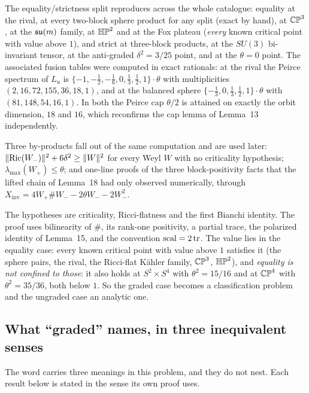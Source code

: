 \begin{certificate}
The equality/strictness split reproduces across the whole catalogue: equality at the rival, at every two-block sphere product for any split (exact by hand), at $\mathbb{CP}^3$, at the $\mathfrak{su}(m)$ family, at $\mathbb{HP}^2$ and at the Fox plateau (\emph{every} known critical point with value above $1$), and strict at three-block products, at the $SU(3)$ bi-invariant tensor, at the anti-graded $\delta^2=3/25$ point, and at the $\theta=0$ point. The associated fusion tables were computed in exact rationals: at the rival the Peirce spectrum of $L_u$ is $\{-1,-\tfrac12,-\tfrac16,0,\tfrac13,\tfrac12,1\}\cdot\theta$ with multiplicities $(2,16,72,155,36,18,1)$, and at the balanced sphere $\{-\tfrac13,0,\tfrac13,\tfrac12,1\}\cdot\theta$ with $(81,148,54,16,1)$. In both the Peirce cap $\theta/2$ is attained on exactly the orbit dimension, $18$ and $16$, which reconfirms the cap lemma of Lemma~13 independently.
\end{certificate}

Three by-products fall out of the same computation and are used later: $\|\mathrm{Ric}(W_-)\|^2+6\delta^2\ge\|W\|^2$ for every Weyl $W$ with no criticality hypothesis; $\lambda_{\max}(W_+)\le\theta$; and one-line proofs of the three block-positivity facts that the lifted chain of Lemma~18 had only observed numerically, through $X_{\mathrm{inv}}=4W_+\#W_--2\theta W_--2W_-^2$.

The hypotheses are criticality, Ricci-flatness and the first Bianchi identity. The proof uses bilinearity of $\#$, its rank-one positivity, a partial trace, the polarized identity of Lemma~15, and the convention $\mathrm{scal}=2\operatorname{tr}$. The value lies in the equality case: every known critical point with value above $1$ satisfies it (the sphere pairs, the rival, the Ricci-flat K\"ahler family, $\mathbb{CP}^3$, $\mathbb{HP}^2$), and \emph{equality is not confined to those}: it also holds at $S^2\times S^4$ with $\theta^2=15/16$ and at $\mathbb{CP}^4$ with $\theta^2=35/36$, both below $1$. So the graded case becomes a classification problem and the ungraded case an analytic one.

\subsection{What ``graded'' names, in three inequivalent senses}\label{sec:senses}

The word carries three meanings in this problem, and they do not nest. Each result below is stated in the sense its own proof uses.

